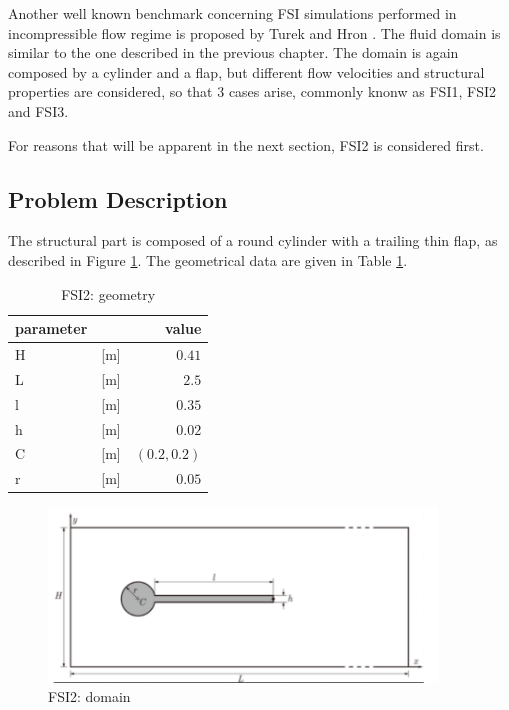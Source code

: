 Another well known benchmark concerning FSI simulations performed in incompressible flow regime is proposed by Turek and Hron \cite{turek2006proposal}. The fluid domain is similar to the one described in the previous chapter. The domain is again composed by a cylinder and a flap, but different flow velocities and structural properties are considered, so that 3 cases arise, commonly knonw as FSI1, FSI2 and FSI3.

For reasons that will be apparent in the next section, FSI2 is considered first. 

\subsection{Problem Description}

The structural part is composed of a round cylinder with a trailing thin flap, as described in Figure \ref{fig:fsi2_domain}. The geometrical data are given in Table \ref{table:fsi2-geom}.

\begin{table}[!htb]
	\begin{center}
		\begin{tabular}{ l c | r } 
			parameter & & value   \\ 
			\hline
			H  & [\si{m}] & $0.41$     \\
			L &  [\si{m}] & $2.5$  \\
			l  & [\si{m}] & $0.35$  \\
			h  & [\si{m}] & $0.02$  \\
			C  & [\si{m}] & $\left(0.2,0.2 \right)$  \\
			r  & [\si{m}] & $0.05$  \\
		\end{tabular}
	\end{center}
	\caption{FSI2: geometry}
	\label{table:fsi2-geom}
\end{table}

\begin{figure}[htbp!]
	\centering
	\includegraphics[width=0.92\textwidth, trim=0 0 50 0, clip]{images/FSI2/FSI2.png}
	\caption{FSI2: domain}
	\label{fig:fsi2_domain}
\end{figure}


